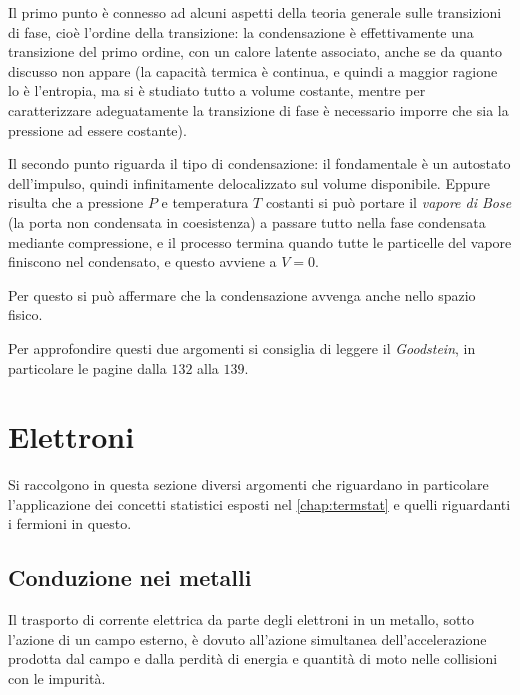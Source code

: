 Il primo punto è connesso ad alcuni aspetti della teoria generale sulle transizioni di fase, cioè l'ordine della transizione: la condensazione è effettivamente una transizione del primo ordine, con un calore latente associato, anche se da quanto discusso non appare (la capacità termica è continua, e quindi a maggior ragione lo è l'entropia, ma si è studiato tutto a volume costante, mentre per caratterizzare adeguatamente la transizione di fase è necessario imporre che sia la pressione ad essere costante).
\newline

Il secondo punto riguarda il tipo di condensazione: il fondamentale è un autostato dell'impulso, quindi infinitamente delocalizzato sul volume disponibile. Eppure risulta che a pressione $ P $ e temperatura $ T $ costanti si può portare il \textit{vapore di Bose} (la porta non condensata in coesistenza) a passare tutto nella fase condensata mediante compressione, e il processo termina quando tutte le particelle del vapore finiscono nel condensato, e questo avviene a $ V = 0 $.

Per questo si può affermare che la condensazione avvenga anche nello spazio fisico.


\begin{note}
	Per approfondire questi due argomenti si consiglia di leggere il \textit{Goodstein}, in particolare le pagine dalla $ 132 $ alla $ 139 $.
\end{note}

\section{Elettroni}

Si raccolgono in questa sezione diversi argomenti che riguardano in particolare l'applicazione dei concetti statistici esposti nel \cref{chap:termstat} e quelli riguardanti i fermioni in questo.

\subsection{Conduzione nei metalli}

Il trasporto di corrente elettrica da parte degli elettroni in un metallo, sotto l'azione di un campo esterno, è dovuto all'azione simultanea dell'accelerazione prodotta dal campo e dalla perdità di energia e quantità di moto nelle collisioni con le impurità.


